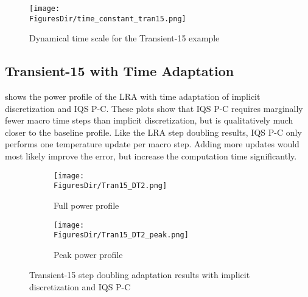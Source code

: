 \begin{figure}[htbp!]
\centering
\texttt{[image: \\FiguresDir/time\_constant\_tran15.png]}
\caption{Dynamical time scale for the Transient-15 example}
\label{fig:tran15tc}
\end{figure}

\subsection{Transient-15 with Time Adaptation}

 shows the power profile of the LRA with time adaptation of implicit discretization and IQS P-C.  These plots show that IQS P-C requires marginally fewer macro time steps than implicit discretization, but is qualitatively much closer to the baseline profile. Like the LRA step doubling results, IQS P-C only performs one temperature update per macro step. Adding more updates would most likely improve the error, but increase the computation time significantly. 

\begin{figure}[!htbp]
\centering
\begin{subfigure}[!htbp]{0.49\textwidth}
\texttt{[image: \\FiguresDir/Tran15\_DT2.png]}
\caption{Full power profile}
\end{subfigure}
\begin{subfigure}[!htbp]{0.49\textwidth}
\texttt{[image: \\FiguresDir/Tran15\_DT2\_peak.png]}
\caption{Peak power profile}
\end{subfigure}
\caption{Transient-15 step doubling adaptation results with implicit discretization and IQS P-C}
\label{fig:Tran15_dt2}
\end{figure}

